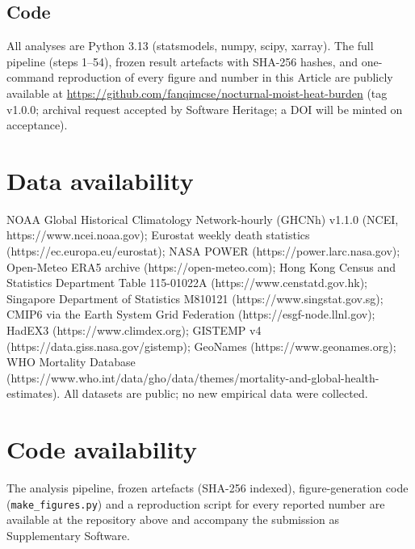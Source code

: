 \documentclass[12pt,a4paper]{article}
\begin{document}
\subsection*{Code}
All analyses are Python 3.13 (statsmodels, numpy, scipy, xarray). The full pipeline (steps
1--54), frozen result artefacts with SHA-256 hashes, and one-command reproduction of every figure
and number in this Article are publicly available at
\url{https://github.com/fanqimcse/nocturnal-moist-heat-burden} (tag v1.0.0; archival request
accepted by Software Heritage; a DOI will be minted on acceptance).

\section*{Data availability}
NOAA Global Historical Climatology Network-hourly (GHCNh) v1.1.0 (NCEI, https://www.ncei.noaa.gov);
Eurostat weekly death statistics (https://ec.europa.eu/eurostat); NASA POWER
(https://power.larc.nasa.gov); Open-Meteo ERA5 archive (https://open-meteo.com); Hong Kong Census
and Statistics Department Table 115-01022A (https://www.censtatd.gov.hk); Singapore Department of
Statistics M810121 (https://www.singstat.gov.sg); CMIP6 via the Earth System Grid Federation
(https://esgf-node.llnl.gov); HadEX3 (https://www.climdex.org); GISTEMP v4
(https://data.giss.nasa.gov/gistemp); GeoNames (https://www.geonames.org); WHO Mortality Database
(https://www.who.int/data/gho/data/themes/mortality-and-global-health-estimates). All datasets are
public; no new empirical data were collected.

\section*{Code availability}
The analysis pipeline, frozen artefacts (SHA-256 indexed), figure-generation code
(\texttt{make\_figures.py}) and a reproduction script for every reported number are available at
the repository above and accompany the submission as Supplementary Software.

\begingroup
\renewcommand{\bibsection}{\section*{References}}


\endgroup

\clearpage


\end{document}
